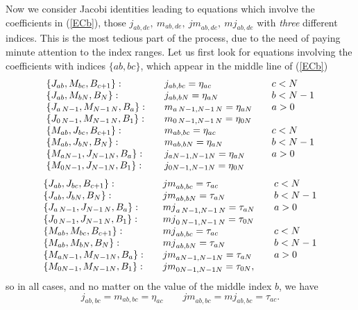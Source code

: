 \documentclass[12pt]{article}
\begin{document}
Now we consider Jacobi identities leading to equations which involve
the coefficients in  (\ref{ECb}), those ${j}_{ab,de},\ {m}_{ab,de},\
{jm}_{ab,de},\ {mj}_{ab,de}$ with \emph{three} different indices. This
is the most tedious part of the process, due to the need of paying
minute attention to the index ranges.  Let us first look for
equations involving the coefficients with indices $\{ab, bc\}$, which
appear in the middle line of (\ref{ECb})
\begin{equation}
\begin{array}{lll}
\{{J}_{ab},{M}_{bc},{B}_{c+1}\}:&\quad {j}_{ab,bc}={\eta}_{ac}&\quad c<N
\cr
\{{J}_{ab},{M}_{bN},{B}_{N}\}:&\quad{j}_{ab,bN}={\eta}_{aN}&\quad b<N-1\cr
\{{J}_{a\,N-1},{M}_{N-1\,N},{B}_{a}\}:
&\quad{m}_{a\,N-1,N-1\,N}={\eta}_{aN}&\quad
a>0\cr
\{{J}_{0\,N-1},{M}_{N-1\,N},{B}_{1}\}:
&\quad{m}_{0\,N-1,N-1\,N}={\eta}_{0N}&\cr
 \{{M}_{ab},{J}_{bc},{B}_{c+1}\}:&\quad{m}_{ab,bc}={\eta}_{ac}&\quad c<N
\cr
\{{M}_{ab},{J}_{bN},{B}_{N}\}:&\quad{m}_{ab,bN}={\eta}_{aN}&\quad b<N-1\cr
\{{M}_{aN-1},{J}_{N-1N},{B}_{a}\}:&\quad{j}_{aN-1,N-1N}={\eta}_{aN}
&\quad a>0\cr
\{{M}_{0N-1},{J}_{N-1N},{B}_{1}\}:&\quad {j}_{0N-1,N-1N}={\eta}_{0N}
\end{array}
\label{ch}
\end{equation}
\begin{equation}
\begin{array}{lll}
\{{J}_{ab},{J}_{bc},{B}_{c+1}\}:&\quad {jm}_{ab,bc}={\tau}_{ac}&\quad c<N
\cr
\{{J}_{ab},{J}_{bN},{B}_{N}\}:&\quad{jm}_{ab,bN}={\tau}_{aN}&\quad b<N-1\cr
\{{J}_{a\,N-1},{J}_{N-1\,N},{B}_{a}\}:
&\quad{mj}_{a\,N-1,N-1\,N}={\tau}_{aN}&\quad
a>0\cr
\{{J}_{0\,N-1},{J}_{N-1\,N},{B}_{1}\}:
&\quad{mj}_{0\,N-1,N-1\,N}={\tau}_{0N}&\cr
 \{{M}_{ab},{M}_{bc},{B}_{c+1}\}:&\quad{mj}_{ab,bc}={\tau}_{ac}&\quad c<N
\cr
\{{M}_{ab},{M}_{bN},{B}_{N}\}:&\quad{mj}_{ab,bN}={\tau}_{aN}&\quad b<N-1\cr
\{{M}_{aN-1},{M}_{N-1N},{B}_{a}\}:&\quad{jm}_{aN-1,N-1N}={\tau}_{aN}
&\quad a>0\cr
\{{M}_{0N-1},{M}_{N-1N},{B}_{1}\}:&\quad {jm}_{0N-1,N-1N}={\tau}_{0N},
\end{array}
\label{ci}
\end{equation}
so in all cases, and no matter on the value of the middle index $b$,
we have
\begin{equation}
{j}_{ab,bc}={m}_{ab,bc}={\eta}_{ac}  \qquad
{jm}_{ab,bc}={mj}_{ab,bc}={\tau}_{ac}.
\label{cii}
\end{equation}
\end{document}
